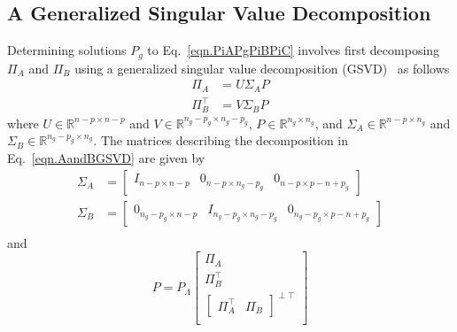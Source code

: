 \documentclass[journal]{IEEEtran}
\theoremstyle{innercustomthm}
\begin{document}
  \subsection{A Generalized Singular Value Decomposition}

  Determining solutions $P_{g}$ to Eq.\ \eqref{eqn.PiAPgPiBPiC} involves first decomposing $\Pi_{A}$ and $\Pi_{B}$ using a generalized singular value decomposition (GSVD)\ \cite{golub.matrix.1996,dai.symmetric.1996,paige.towardsgsvd.1981,hua.symmetric.1990} as follows
  \begin{equation}
    \label{eqn.AandBGSVD}
    \begin{split}
      \Pi_{A} &= U\Sigma_{A}P \\
      \Pi_{B}^{\top} &= V\Sigma_{B}P
    \end{split}
  \end{equation}
  where $U\in\mathbb{R}^{n-p\times n-p}$ and $V\in\mathbb{R}^{n_{g}-p_{g}\times n_{g}-p_{g}}$, $P\in\mathbb{R}^{n_{g}\times n_{g}}$, and $\Sigma_{A}\in\mathbb{R}^{n-p\times n_{g}}$ and $\Sigma_{B}\in\mathbb{R}^{n_{g}-p_{g}\times n_{g}}$.
  The matrices describing the decomposition in Eq.\ \eqref{eqn.AandBGSVD} are given by
  {%
    \small
    \begin{equation}
      \label{eqn.SigmaASigmaB}
      \begin{split}
        \Sigma_{A}
        &=
        \begin{bmatrix}
          I_{n-p\times n-p} & 0_{n-p\times n_{g}-p_{g}} & 0_{n-p\times p-n+p_{g}}
        \end{bmatrix} \\
        \Sigma_{B}
        &=
        \begin{bmatrix}
          0_{n_{g}-p_{g}\times n-p} & I_{n_{g}-p_{g}\times n_{g}-p_{g}} & 0_{n_{g}-p_{g}\times p-n+p_{g}}
        \end{bmatrix} \\
      \end{split}
    \end{equation}
  }%
  and
  \begin{equation}
    \label{eqn.P}
    P = P_{\Lambda}
    \begin{bmatrix}
      \Pi_{A} \\
      \Pi_{B}^{\top} \\
      \begin{bmatrix}
        \Pi_{A}^{\top} & \Pi_{B}
      \end{bmatrix}^{\perp\top} \\
    \end{bmatrix}
  \end{equation}
\end{document}
